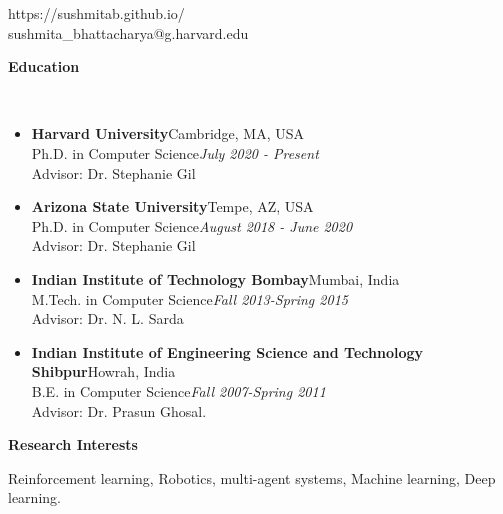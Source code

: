 \documentclass[a4paper,11pt]{article}
\newcommand{\lsep}{-0.5cm}
\newcommand{\resheading}[1]{{\small \colorbox{mygrey}{\begin{minipage}{0.975\textwidth}{\textbf{#1 \vphantom{p\^{E}}}}\end{minipage}}}}
\begin{document}
\hfill https://sushmitab.github.io/\\
\hfill sushmita\_bhattacharya@g.harvard.edu\\
\setlength{\tabcolsep}{5pt}

\vspace{10pt}

\resheading{\textbf{\large Education} }\\[\lsep]
\begin{description}
\item 
\begin{itemize}
\item \textbf{Harvard  University}\hfill Cambridge, MA, USA\\
Ph.D. in Computer Science\hfill \textit{July 2020 - Present}\\
Advisor: Dr. Stephanie Gil
\end{itemize}
\item
\begin{itemize}
\item \textbf{Arizona State University}\hfill Tempe, AZ, USA\\
	Ph.D. in Computer Science\hfill \textit{August 2018 - June 2020}\\
	Advisor: Dr. Stephanie Gil
\end{itemize}
\item
\begin{itemize}
\item \textbf{Indian Institute of Technology Bombay}\hfill Mumbai, India\\
	M.Tech. in Computer Science\hfill \textit{Fall 2013-Spring 2015}\\
	Advisor: Dr. N. L. Sarda
\end{itemize}
\item
\begin{itemize}
\item \textbf{Indian Institute of Engineering Science and Technology Shibpur}\hfill Howrah, India\\
	B.E. in Computer Science\hfill \textit{Fall 2007-Spring 2011}\\
	Advisor: Dr. Prasun Ghosal.
\end{itemize}
\end{description}

\resheading{\textbf{\large Research Interests}}
\begin{description}
	\item \hspace{0.75 cm} Reinforcement learning, Robotics, multi-agent systems, Machine learning, Deep learning.
\end{description}
\end{document}
